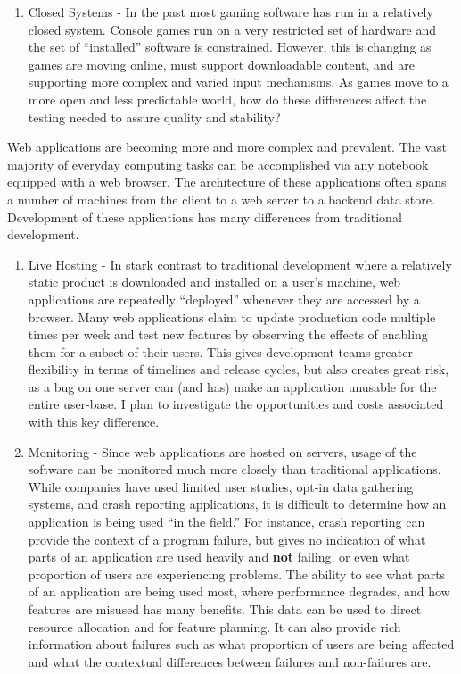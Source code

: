 \documentclass[10pt]{article}
\begin{document}
\begin{small}
\begin{enumerate}
\item Closed Systems - In the past most gaming software has run in a relatively closed
    system. Console games run on a very restricted set of hardware and the set of ``installed''
    software is constrained.  However, this is changing as games are moving online,
    must support downloadable content, and are supporting more complex and varied input 
    mechanisms.  As games move to a more open and less predictable world,
    how do these differences affect the testing needed to assure quality and stability?  

\end{enumerate}

Web applications are becoming more and more complex and prevalent.  The vast
majority of everyday computing tasks can be accomplished via any notebook
equipped with a web browser.  The architecture of these applications often spans a number of
machines from the client to a web server to a backend data store.  Development of these
applications has many differences from traditional development.

\begin{enumerate}

\item Live Hosting - 
    In stark contrast to traditional development where a relatively static
    product is downloaded and installed on a user's machine, web applications are repeatedly ``deployed''
    whenever they are accessed by a browser.  Many web applications 
    claim to update production code multiple times per week and 
    test new features by observing the effects of enabling them for a subset of their users. 
    This gives development teams greater flexibility in terms of timelines and release cycles, but
    also creates great risk, as a bug on one server can (and has) make an application unusable
    for the entire user-base.
    I plan to investigate the opportunities and costs associated with this key difference.

\item Monitoring - Since web applications are hosted on servers, usage of the software
    can be monitored much more closely than traditional applications.  While companies have used limited
    user studies, opt-in data gathering systems, and crash reporting applications, it is difficult
    to determine how an application is being used ``in the field.'' For instance, crash reporting
    can provide the context of a program failure, but gives no indication of what parts of an application
    are used heavily and \textbf{not} failing, or even what proportion of users are experiencing problems.
    The ability to see what parts of an application are being used most, where
    performance degrades, and how features are misused has many benefits.  
    This data can be used to direct resource allocation and for
    feature planning.  It can also provide rich information about failures such as what proportion of users 
    are being affected and what the contextual differences between failures and non-failures are.


\end{enumerate}
\end{small}
\end{document}
